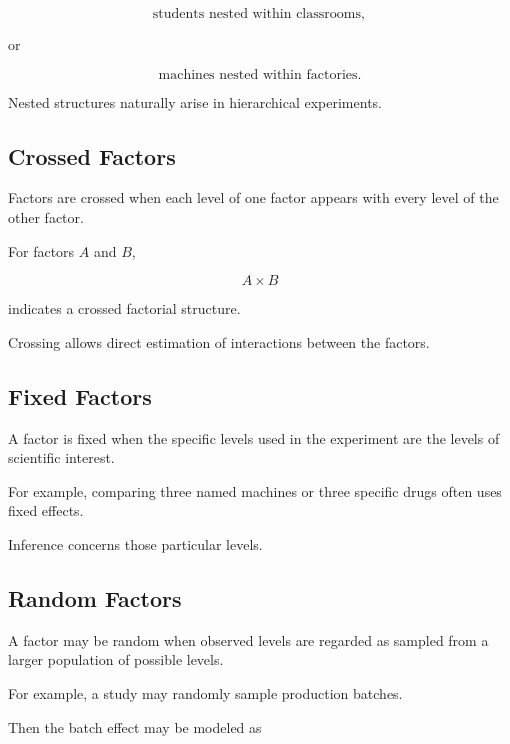 \[
\boxed{
\text{students nested within classrooms},
}
\]

or

\[
\boxed{
\text{machines nested within factories}.
}
\]

Nested structures naturally arise in hierarchical experiments.

\subsection{Crossed Factors}
\label{subsec:crossed-factors-design}

Factors are crossed when each level of one factor appears with every
level of the other factor.

For factors \(A\) and \(B\),

\[
\boxed{
A\times B
}
\]

indicates a crossed factorial structure.

Crossing allows direct estimation of interactions between the factors.

\subsection{Fixed Factors}
\label{subsec:fixed-factors-design}

A factor is fixed when the specific levels used in the experiment are
the levels of scientific interest.

For example, comparing three named machines or three specific drugs often
uses fixed effects.

Inference concerns those particular levels.

\subsection{Random Factors}
\label{subsec:random-factors-design}

A factor may be random when observed levels are regarded as sampled from
a larger population of possible levels.

For example, a study may randomly sample production batches.

Then the batch effect may be modeled as


